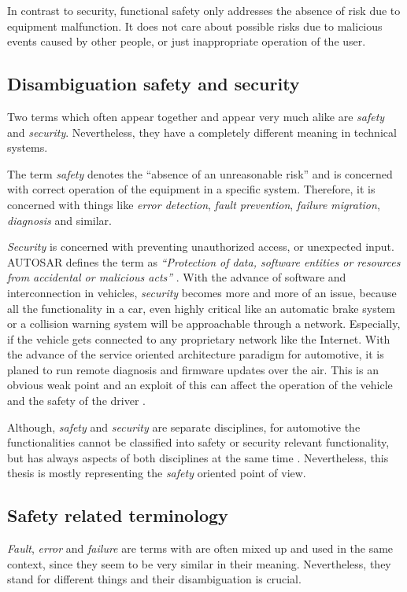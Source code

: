 In contrast to security, functional safety only addresses the absence of risk due to equipment malfunction. It does not care about possible risks due to malicious events caused by other people, or just inappropriate operation of the user.


\subsection{Disambiguation safety and security}
Two terms which often appear together and appear very much alike are \emph{safety} and \emph{security}. Nevertheless, they have a completely different meaning in technical systems.

The term \emph{safety} denotes the ``absence of an unreasonable risk'' \cite{autosar_glossary} \cite{iso26262:1} and is concerned with correct operation of the equipment in a specific system. Therefore, it is concerned with things like \emph{error detection}, \emph{fault prevention}, \emph{failure migration}, \emph{diagnosis} and similar.

\emph{Security} is concerned with preventing unauthorized access, or unexpected input. AUTOSAR defines the term as \emph{``Protection of data, software entities or resources from accidental or malicious acts''} \cite{autosar_glossary}. With the advance of software and interconnection in vehicles, \emph{security} becomes more and more of an issue, because all the functionality in a car, even highly critical like an automatic brake system or a collision warning system will be approachable through a network. Especially, if the vehicle gets connected to any proprietary network like the Internet. With the advance of the service oriented architecture paradigm for automotive, it is planed to run remote diagnosis and firmware updates over the air. This is an obvious weak point and an exploit of this can affect the operation of the vehicle and the safety of the driver \cite{nilsson2008}.

Although, \emph{safety} and \emph{security} are separate disciplines, for automotive the functionalities cannot be classified into safety or security relevant functionality, but has always aspects of both disciplines at the same time \cite{nilsson2008}. Nevertheless, this thesis is mostly representing the \emph{safety} oriented point of view.


\subsection{Safety related terminology}
\label{sec:fault,error,failure}
\emph{Fault}, \emph{error} and \emph{failure} are terms with are often mixed up and used in the same context, since they seem to be very similar in their meaning. Nevertheless, they stand for different things and their disambiguation is crucial.


